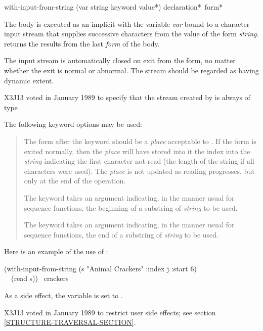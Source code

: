 \begin{defmac}
with-input-from-string (var string {keyword value}*)
      {declaration}* {\,form}*

The body is executed as an implicit  with the variable \emph{var}
bound to a character input stream that supplies successive characters from
the value of the form \emph{string}.  
returns the results from the last \emph{form} of the body.

The input stream is automatically closed on exit from
the  form,
no matter whether the exit is normal or abnormal.
The stream should be regarded as having dynamic extent.

\begin{new}
X3J13 voted in January 1989
to specify that the stream created by
 is always of type .
\end{new}

The following keyword options may be used:
\begin{quotation}
\begin{flushdesc}
\item[\cd{:index}]
The form after the  keyword should be a \emph{place}
acceptable to .  If the  form
is exited normally, then the \emph{place} will have stored into it the
index into the \emph{string} indicating the first character not read
(the length of the string if all characters were used).
The \emph{place} is not updated as reading progresses, but only at the
end of the operation. 

\item[\cd{:start}]
The  keyword takes an argument indicating, in the manner
usual for sequence functions, the beginning of
a substring of \emph{string} to be used.

\item[\cd{:end}]
The  keyword takes an argument indicating, in the manner
usual for sequence functions, the end of
a substring of \emph{string} to be used.
\end{flushdesc}
\end{quotation}

Here is an example of the use of :
\begin{lisp}
(with-input-from-string (s "Animal Crackers" :index j :start 6) \\
~~(read s)) \EV\ crackers
\end{lisp}
As a side effect, the variable  is set to .

\begin{new}
X3J13 voted in January 1989
to restrict user side effects; see section \ref{STRUCTURE-TRAVERSAL-SECTION}.
\end{new}
\end{defmac}

